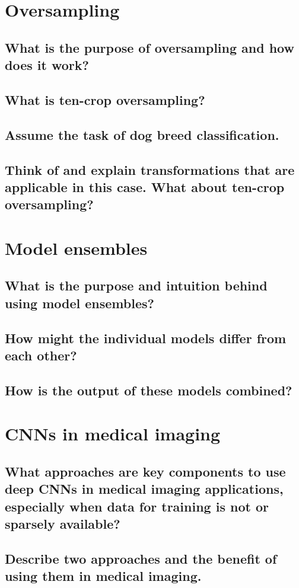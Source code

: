 \section{Oversampling}
\subsection{What is the purpose of oversampling and how does it work?}
\subsection{What is ten-crop oversampling?}
\subsection{Assume the task of dog breed classification.}
\subsection{Think of and explain transformations that are applicable in this case. What about ten-crop oversampling?}

\section{Model ensembles}
\subsection{What is the purpose and intuition behind using model ensembles?}
\subsection{How might the individual models differ from each other?}
\subsection{How is the output of these models combined?}

\section{CNNs in medical imaging}
\subsection{What approaches are key components to use deep CNNs in medical imaging applications, especially when data for training is not or sparsely available?}
\subsection{Describe two approaches and the benefit of using them in medical imaging.}

\addtocounter{section}{-1}\section{}\label{sec:todo}